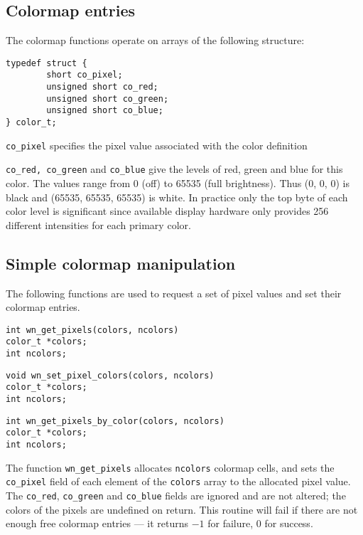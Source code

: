 \subsection{Colormap entries}
\label{color}
The colormap functions operate on arrays of the following structure:
\begin{verbatim}
typedef struct {
        short co_pixel;
        unsigned short co_red;
        unsigned short co_green;
        unsigned short co_blue;
} color_t;
\end{verbatim}
\begin{list}{}{}
\item[\tt co\_pixel]
specifies the pixel value associated with the color definition
\item[{\tt co\_red, co\_green} and  {\tt co\_blue}]
give the levels of red, green and blue for this color.
The values range from 0 (off) to 65535 (full brightness).
Thus (0, 0, 0) is black and (65535, 65535, 65535) is white.
In practice only the top byte of each color level is significant since available
display hardware only provides 256 different intensities for each primary color.
\end{list}
\subsection {Simple colormap manipulation}
The following functions are used to request a set of pixel values and
set their colormap entries.
\begin{verbatim}
int wn_get_pixels(colors, ncolors)
color_t *colors;
int ncolors;
\end{verbatim}
\begin{verbatim}
void wn_set_pixel_colors(colors, ncolors)
color_t *colors;
int ncolors;
\end{verbatim}
\begin{verbatim}
int wn_get_pixels_by_color(colors, ncolors)
color_t *colors;
int ncolors;
\end{verbatim}
The function {\tt wn\_get\_pixels}
allocates {\tt ncolors} colormap cells, and sets the {\tt co\_pixel} field
of each element of the {\tt colors} array to the allocated pixel value.
The {\tt co\_red}, {\tt co\_green} and {\tt co\_blue} fields are ignored and
are not altered; the colors of the pixels are undefined on return.
This routine will fail if there are not enough free colormap entries ---
it returns $-1$ for failure, 0 for success.

